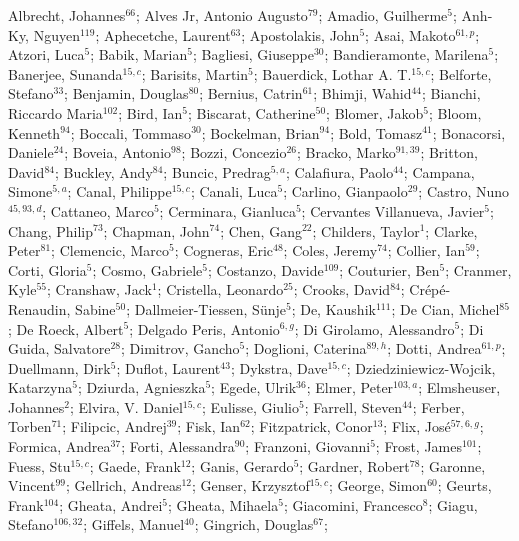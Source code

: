 Albrecht, Johannes$^{66}$;
Alves Jr, Antonio Augusto$^{79}$;
Amadio, Guilherme$^{5}$;
Anh-Ky, Nguyen$^{119}$;
Aphecetche, Laurent$^{63}$;
Apostolakis, John$^{5}$;
Asai, Makoto$^{61,p}$;
Atzori, Luca$^{5}$;
Babik, Marian$^{5}$;
Bagliesi, Giuseppe$^{30}$;
Bandieramonte, Marilena$^{5}$;
Banerjee, Sunanda$^{15,c}$;
Barisits, Martin$^{5}$;
Bauerdick, Lothar A. T.$^{15,c}$;
Belforte, Stefano$^{33}$;
Benjamin, Douglas$^{80}$;
Bernius, Catrin$^{61}$;
Bhimji, Wahid$^{44}$;
Bianchi, Riccardo Maria$^{102}$;
Bird, Ian$^{5}$;
Biscarat, Catherine$^{50}$;
Blomer, Jakob$^{5}$;
Bloom, Kenneth$^{94}$;
Boccali, Tommaso$^{30}$;
Bockelman, Brian$^{94}$;
Bold, Tomasz$^{41}$;
Bonacorsi, Daniele$^{24}$;
Boveia, Antonio$^{98}$;
Bozzi, Concezio$^{26}$;
Bracko, Marko$^{91,39}$;
Britton, David$^{84}$;
Buckley, Andy$^{84}$;
Buncic, Predrag$^{5,a}$;
Calafiura, Paolo$^{44}$;
Campana, Simone$^{5,a}$;
Canal, Philippe$^{15,c}$;
Canali, Luca$^{5}$;
Carlino, Gianpaolo$^{29}$;
Castro, Nuno$^{45,93,d}$;
Cattaneo, Marco$^{5}$;
Cerminara, Gianluca$^{5}$;
Cervantes Villanueva, Javier$^{5}$;
Chang, Philip$^{73}$;
Chapman, John$^{74}$;
Chen, Gang$^{22}$;
Childers, Taylor$^{1}$;
Clarke, Peter$^{81}$;
Clemencic, Marco$^{5}$;
Cogneras, Eric$^{48}$;
Coles, Jeremy$^{74}$;
Collier, Ian$^{59}$;
Corti, Gloria$^{5}$;
Cosmo, Gabriele$^{5}$;
Costanzo, Davide$^{109}$;
Couturier, Ben$^{5}$;
Cranmer, Kyle$^{55}$;
Cranshaw, Jack$^{1}$;
Cristella, Leonardo$^{25}$;
Crooks, David$^{84}$;
Crépé-Renaudin, Sabine$^{50}$;
Dallmeier-Tiessen, Sünje$^{5}$;
De, Kaushik$^{111}$;
De Cian, Michel$^{85}$;
De Roeck, Albert$^{5}$;
Delgado Peris, Antonio$^{6,g}$;
Di Girolamo, Alessandro$^{5}$;
Di Guida, Salvatore$^{28}$;
Dimitrov, Gancho$^{5}$;
Doglioni, Caterina$^{89,h}$;
Dotti, Andrea$^{61,p}$;
Duellmann, Dirk$^{5}$;
Duflot, Laurent$^{43}$;
Dykstra, Dave$^{15,c}$;
Dziedziniewicz-Wojcik, Katarzyna$^{5}$;
Dziurda, Agnieszka$^{5}$;
Egede, Ulrik$^{36}$;
Elmer, Peter$^{103,a}$;
Elmsheuser, Johannes$^{2}$;
Elvira, V. Daniel$^{15,c}$;
Eulisse, Giulio$^{5}$;
Farrell, Steven$^{44}$;
Ferber, Torben$^{71}$;
Filipcic, Andrej$^{39}$;
Fisk, Ian$^{62}$;
Fitzpatrick, Conor$^{13}$;
Flix, José$^{57,6,g}$;
Formica, Andrea$^{37}$;
Forti, Alessandra$^{90}$;
Franzoni, Giovanni$^{5}$;
Frost, James$^{101}$;
Fuess, Stu$^{15,c}$;
Gaede, Frank$^{12}$;
Ganis, Gerardo$^{5}$;
Gardner, Robert$^{78}$;
Garonne, Vincent$^{99}$;
Gellrich, Andreas$^{12}$;
Genser, Krzysztof$^{15,c}$;
George, Simon$^{60}$;
Geurts, Frank$^{104}$;
Gheata, Andrei$^{5}$;
Gheata, Mihaela$^{5}$;
Giacomini, Francesco$^{8}$;
Giagu, Stefano$^{106,32}$;
Giffels, Manuel$^{40}$;
Gingrich, Douglas$^{67}$;
